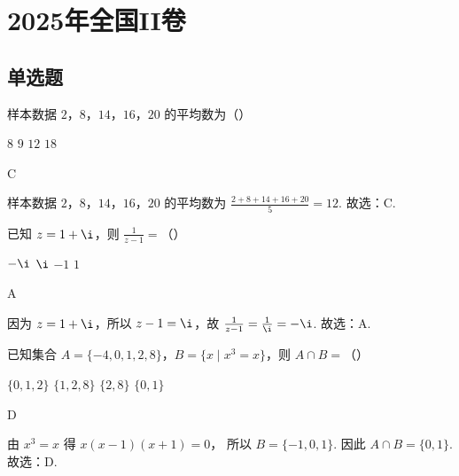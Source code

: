 \documentclass[UTF8,a4paper,oneside,11pt]{ctexbook}
\begin{document}
\mainmatter

\chapter{2025年全国II卷}

\section{单选题}

\begin{problem}
样本数据 \(2\)，\(8\)，\(14\)，\(16\)，\(20\) 的平均数为（\quad）

\choices
    {\(8\)}
    {\(9\)}
    {\(12\)}
    {\(18\)}
\end{problem}

\begin{answer}
C
\end{answer}

\begin{solution}
样本数据 \(2\)，\(8\)，\(14\)，\(16\)，\(20\) 的平均数为
\(\frac{2+8+14+16+20}{5}=12\).
故选：C.
\end{solution}

\begin{problem}
已知 \(z=1+\i\)，则 \(\frac{1}{z-1}=\)（\quad）

\choices
    {\(-\i\)}
    {\(\i\)}
    {\(-1\)}
    {\(1\)}
\end{problem}

\begin{answer}
A
\end{answer}

\begin{solution}
因为 \(z=1+\i\)，所以 \(z-1=\i\)，故
\(\frac{1}{z-1}=\frac{1}{\i}=-\i\).
故选：A.
\end{solution}

\begin{problem}
已知集合 \(A=\{-4,0,1,2,8\}\)，\(B=\{x \mid x^3=x\}\)，则 \(A\cap B=\)（\quad）

\choices
    {\(\{0,1,2\}\)}
    {\(\{1,2,8\}\)}
    {\(\{2,8\}\)}
    {\(\{0,1\}\)}
\end{problem}

\begin{answer}
D
\end{answer}

\begin{solution}
由 \(x^3=x\) 得
\(x(x-1)(x+1)=0\)，
所以 \(B=\{-1,0,1\}\). 因此
\(A\cap B=\{0,1\}\).
故选：D.
\end{solution}
\end{document}
